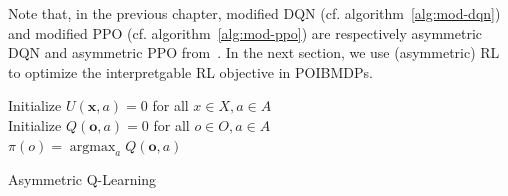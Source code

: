 Note that, in the previous chapter, modified DQN (cf. algorithm~\ref{alg:mod-dqn}) and modified PPO (cf. algorithm~\ref{alg:mod-ppo}) are respectively asymmetric DQN and asymmetric PPO from~\cite{baisero-dqn,baisero-ppo}.
In the next section, we use (asymmetric) RL to optimize the interpretgable RL objective in POIBMDPs.
\begin{algorithm}
    Initialize $U(\boldsymbol{x},a) = 0$ for all $x \in X, a \in A$ \\
    Initialize $Q(\boldsymbol{o},a) = 0$ for all $o \in O, a \in A$ \\

    $\pi(o) = \operatorname{argmax}_a Q(\boldsymbol{o},a)$ 
    \caption{Asymmetric Q-Learning}\label{alg:asymqlearning}
\end{algorithm}


